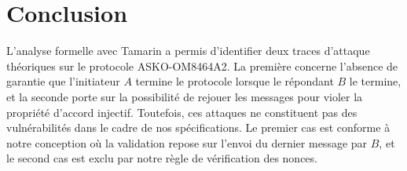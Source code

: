 \documentclass[11pt]{article}
\begin{document}
\section{Conclusion}

L'analyse formelle avec Tamarin a permis d'identifier deux traces d'attaque théoriques sur le 
protocole ASKO-OM8464A2. La première concerne l'absence de garantie que l'initiateur $A$ termine 
le protocole lorsque le répondant $B$ le termine, et la seconde porte sur la possibilité de 
rejouer les messages pour violer la propriété d'accord injectif. Toutefois, ces attaques ne 
constituent pas des vulnérabilités dans le cadre de nos spécifications. Le premier cas est 
conforme à notre conception où la validation repose sur l'envoi du dernier message par $B$, 
et le second cas est exclu par notre règle de vérification des nonces.
\end{document}
